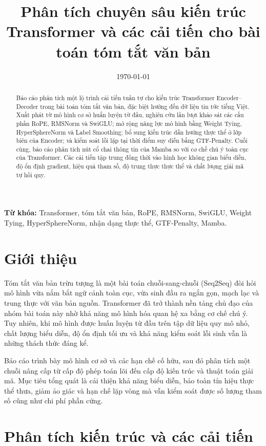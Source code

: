 \documentclass[11pt,a4paper]{article}
\title{\textbf{Phân tích chuyên sâu kiến trúc Transformer và các cải tiến cho bài toán tóm tắt văn bản}}
\author{}
\date{\today}
\numberwithin{equation}{section}
\begin{document}
\maketitle

\begin{abstract}
Báo cáo phân tích một lộ trình cải tiến tuần tự cho kiến trúc Transformer Encoder--Decoder trong bài toán tóm tắt văn bản, đặc biệt hướng đến dữ liệu tin tức tiếng Việt. Xuất phát từ mô hình cơ sở huấn luyện từ đầu, nghiên cứu lần lượt khảo sát các cấu phần RoPE, RMSNorm và SwiGLU; mở rộng năng lực mô hình bằng Weight Tying, HyperSphereNorm và Label Smoothing; bổ sung kiến trúc dẫn hướng thực thể ở lớp biên của Encoder; và kiểm soát lỗi lặp tại thời điểm suy diễn bằng GTF-Penalty. Cuối cùng, báo cáo phân tích nút cổ chai thông tin của Mamba so với cơ chế chú ý toàn cục của Transformer. Các cải tiến tập trung đồng thời vào hình học không gian biểu diễn, độ ổn định gradient, hiệu quả tham số, độ trung thực thực thể và chất lượng giải mã tự hồi quy.
\end{abstract}

\noindent\textbf{Từ khóa:} Transformer, tóm tắt văn bản, RoPE, RMSNorm, SwiGLU, Weight Tying, HyperSphereNorm, nhận dạng thực thể, GTF-Penalty, Mamba.

\section{Giới thiệu}

Tóm tắt văn bản trừu tượng là một bài toán chuỗi-sang-chuỗi (Seq2Seq) đòi hỏi mô hình vừa nắm bắt ngữ cảnh toàn cục, vừa sinh đầu ra ngắn gọn, mạch lạc và trung thực với văn bản nguồn. Transformer đã trở thành nền tảng chủ đạo của nhóm bài toán này nhờ khả năng mô hình hóa quan hệ xa bằng cơ chế chú ý. Tuy nhiên, khi mô hình được huấn luyện từ đầu trên tập dữ liệu quy mô nhỏ, chất lượng biểu diễn, độ ổn định tối ưu và khả năng kiểm soát lỗi sinh vẫn là những thách thức đáng kể.

Báo cáo trình bày mô hình cơ sở và các hạn chế cố hữu, sau đó phân tích một chuỗi nâng cấp từ cấp độ phép toán lõi đến cấp độ kiến trúc và thuật toán giải mã. Mục tiêu tổng quát là cải thiện khả năng biểu diễn, bảo toàn tín hiệu thực thể thưa, giảm ảo giác và hạn chế lặp vòng mà vẫn kiểm soát được số lượng tham số cũng như chi phí phần cứng.

\section{Phân tích kiến trúc và các cải tiến}
\end{document}
